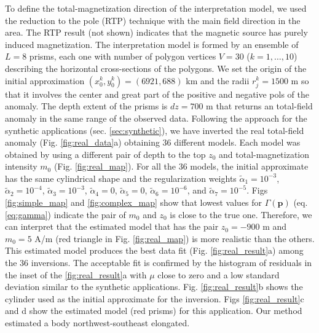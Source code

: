 To define the total-magnetization direction of the interpretation model, we used the reduction to the pole (RTP) technique with the main field direction in the area. The RTP result (not shown) indicates that the magnetic source has purely induced magnetization. The interpretation model is formed by an ensemble of $L = 8$ prisms, each one with number of polygon vertices $V = 30$ ($k = 1, \dots , 10$) describing the horizontal cross-sections of the polygons. We set the origin of the initial approximation $(x_0^k, y_0^k) = (6921, 688)$ km and the radii $r_j^k = 1500$ m so that it involves the center and great part of the positive and negative pols of the anomaly. The depth extent of the prisms is $dz = 700$ m that returns an total-field anomaly in the same range of the observed data. Following the approach for the synthetic applications (sec. \ref{sec:synthetic}), we have inverted the real total-field anomaly (Fig. \ref{fig:real_data}a) obtaining 36 different models. Each model was obtained by using a different pair of depth to the top $z_0$ and total-magnetization intensity $m_0$ (Fig. \ref{fig:real_map}). For all the 36 models, the initial approximate has the same cylindrical shape and the regularization weights $\tilde{\alpha}_1 = 10^{-3}$, $\tilde{\alpha}_2 = 10^{-4}$, $\tilde{\alpha}_3 = 10^{-3}$, $\tilde{\alpha}_4 = 0$, $\tilde{\alpha}_5 = 0$, $\tilde{\alpha}_6 = 10^{-6}$, and $\tilde{\alpha}_7 = 10^{-5}$. Figs \ref{fig:simple_map} and \ref{fig:complex_map} show that lowest values for $\Gamma(\mathbf{p})$ (eq. \ref{eq:gamma}) indicate the pair of $m_0$ and $z_0$ is close to the true one. Therefore, we can interpret that the estimated model that has the pair $z_0 = -900$ m and $m_0 = 5$ A/m (red triangle in Fig. \ref{fig:real_map}) is more realistic than the others. This estimated model produces the best data fit (Fig. \ref{fig:real_result}a) among the 36 inversions. The acceptable fit is confirmed by the histogram of residuals in the inset of the \ref{fig:real_result}a with $ \mu $ close to zero and a low standard deviation similar to the synthetic applications. Fig. \ref{fig:real_result}b shows the cylinder used as the initial approximate for the inversion. Figs \ref{fig:real_result}c and d show the estimated model (red prisms) for this application. Our method estimated a body northwest-southeast elongated.